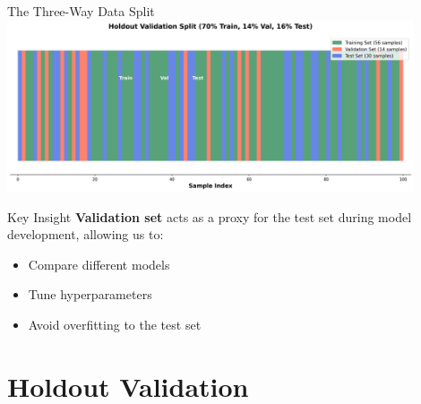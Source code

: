 \documentclass[8pt,aspectratio=1610]{beamer}
\begin{document}
\begin{frame}{The Three-Way Data Split}
\centering
\includegraphics[width=0.9\textwidth]{../figures/holdout_validation.png}

\vspace{0.3cm}

\begin{alertblock}{Key Insight}
\textbf{Validation set} acts as a proxy for the test set during model development, allowing us to:
\begin{itemize}
\item Compare different models
\item Tune hyperparameters
\item Avoid overfitting to the test set
\end{itemize}
\end{alertblock}
\end{frame}


\section{Holdout Validation}
\end{document}
